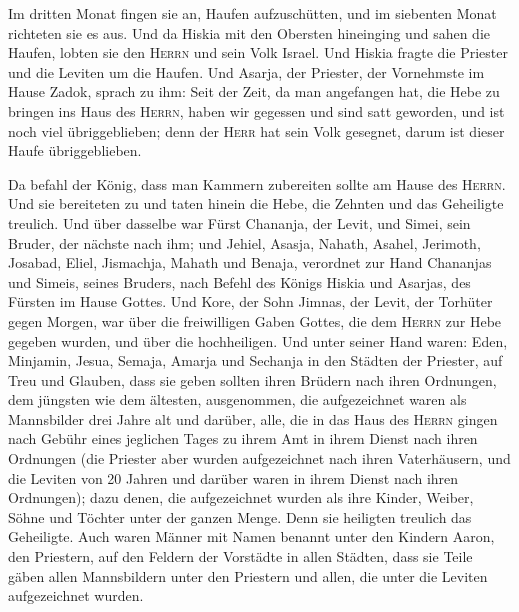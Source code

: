  Im dritten Monat fingen sie an, Haufen aufzuschütten, und
im siebenten Monat richteten sie es aus.  Und da Hiskia
mit den Obersten hineinging und sahen die Haufen, lobten sie den
\textsc{Herrn} und sein Volk Israel.  Und Hiskia fragte
die Priester und die Leviten um die Haufen.  Und Asarja,
der Priester, der Vornehmste im Hause Zadok, sprach zu ihm: Seit der
Zeit, da man angefangen hat, die Hebe zu bringen ins Haus des
\textsc{Herrn}, haben wir gegessen und sind satt geworden, und ist noch
viel übriggeblieben; denn der \textsc{Herr} hat sein Volk gesegnet,
darum ist dieser Haufe übriggeblieben.

 Da befahl der König, dass man Kammern zubereiten sollte
am Hause des \textsc{Herrn}. Und sie bereiteten zu  und
taten hinein die Hebe, die Zehnten und das Geheiligte treulich. Und über
dasselbe war Fürst Chananja, der Levit, und Simei, sein Bruder, der
nächste nach ihm;  und Jehiel, Asasja, Nahath, Asahel,
Jerimoth, Josabad, Eliel, Jismachja, Mahath und Benaja, verordnet zur
Hand Chananjas und Simeis, seines Bruders, nach Befehl des Königs Hiskia
und Asarjas, des Fürsten im Hause Gottes.  Und Kore, der
Sohn Jimnas, der Levit, der Torhüter gegen Morgen, war über die
freiwilligen Gaben Gottes, die dem \textsc{Herrn} zur Hebe gegeben
wurden, und über die hochheiligen.  Und unter seiner Hand
waren: Eden, Minjamin, Jesua, Semaja, Amarja und Sechanja in den Städten
der Priester, auf Treu und Glauben, dass sie geben sollten ihren Brüdern
nach ihren Ordnungen, dem jüngsten wie dem ältesten, 
ausgenommen, die aufgezeichnet waren als Mannsbilder drei Jahre alt und
darüber, alle, die in das Haus des \textsc{Herrn} gingen nach Gebühr
eines jeglichen Tages zu ihrem Amt in ihrem Dienst nach ihren Ordnungen
 (die Priester aber wurden aufgezeichnet nach ihren
Vaterhäusern, und die Leviten von 20 Jahren und darüber waren in ihrem
Dienst nach ihren Ordnungen);  dazu denen, die
aufgezeichnet wurden als ihre Kinder, Weiber, Söhne und Töchter unter
der ganzen Menge. Denn sie heiligten treulich das Geheiligte.
 Auch waren Männer mit Namen benannt unter den Kindern
Aaron, den Priestern, auf den Feldern der Vorstädte in allen Städten,
dass sie Teile gäben allen Mannsbildern unter den Priestern und allen,
die unter die Leviten aufgezeichnet wurden.

